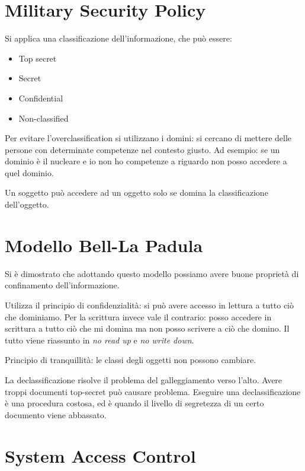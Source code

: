 \section{Military Security Policy}

Si applica una classificazione dell'informazione, che può essere:
\begin{itemize}
 \item Top secret
 \item Secret
 \item Confidential
 \item Non-classified

\end{itemize}

Per evitare l'overclassification si utilizzano i domini: si cercano di mettere
delle persone con determinate competenze nel contesto giusto.
Ad esempio: se un dominio è il nucleare e io non ho competenze a riguardo non
posso accedere a quel dominio.

Un soggetto può accedere ad un oggetto solo se domina la classificazione
dell'oggetto.

\section{Modello Bell-La Padula}

Si è dimostrato che adottando questo modello possiamo avere buone proprietà di
confinamento dell'informazione.

Utilizza il principio di confidenzialità: si può avere accesso in lettura a
tutto ciò che dominiamo. Per la scrittura invece vale il contrario: posso
accedere in scrittura a tutto ciò che mi domina ma non posso scrivere a ciò che
domino. Il tutto viene riassunto in \textit{no read up} e \textit{no write
down}.

Principio di tranquillità: le classi degli oggetti non possono cambiare.

La declassificazione risolve il problema del galleggiamento verso l'alto. Avere
troppi documenti top-secret può causare problema. Eseguire una
declassificazione è una procedura costosa, ed è quando il livello di segretezza
di un certo documento viene abbassato.

\section{System Access Control}

